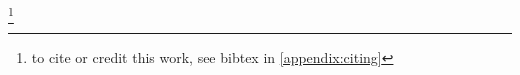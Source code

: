 \newcommand{\mjmaside}[1]{
 \fbox{  
\begin{minipage}[t]{\textwidth}
{ \centering{\bf{Aside: }} }
\par   
#1 
\end{minipage} 
}
}




\newcommand{\mjmgraphics}[1]{#1 }
\newcommand{\mjmfullplot}[1]{\texttt{[image: \#1]}}
\newcommand{\mjmincludeplot}[1]{\texttt{[image: \#1]}}

\newcommand{\mjmreffig}[1]{Fig. \ref{fig:#1}}
\newcommand{\mjmreftab}[1]{Table  \ref{tab:#1}}
\newcommand{\mjmrefeqn}[1]{Eqn  \ref{eqn:#1}}
\newcommand{\mjmrefapp}[1]{Appendix \ref{appendix:#1}}


\newcommand{\mjmdatedplot}[1] 
{ \texttt{[image: keep/pp20171124\#1]} }
\newcommand{\mjmbeginfigure}{\begin{figure}[H] }
\newcommand{\mjmfigure}[1]{
\mjmbeginfigure

#1 

\end{figure}
}

\newcommand{\mjmlisting}[1]
{
\begin{lstlisting} 
#1 
\end{lstlisting}
}

\newcommand{\mjmold}[1]{ } 



\newcommand{\mjmeqn}[1]{\begin{equation} #1 \end{equation}  } 







\title{\mjmtitle}
\author         {Mike Marchywka}
\email          {\mjmemail}
\thanks{ to cite  or credit this work, see bibtex in \ref{appendix:citing} } 
\date{\today}
\affiliation{\mjmaddr}

